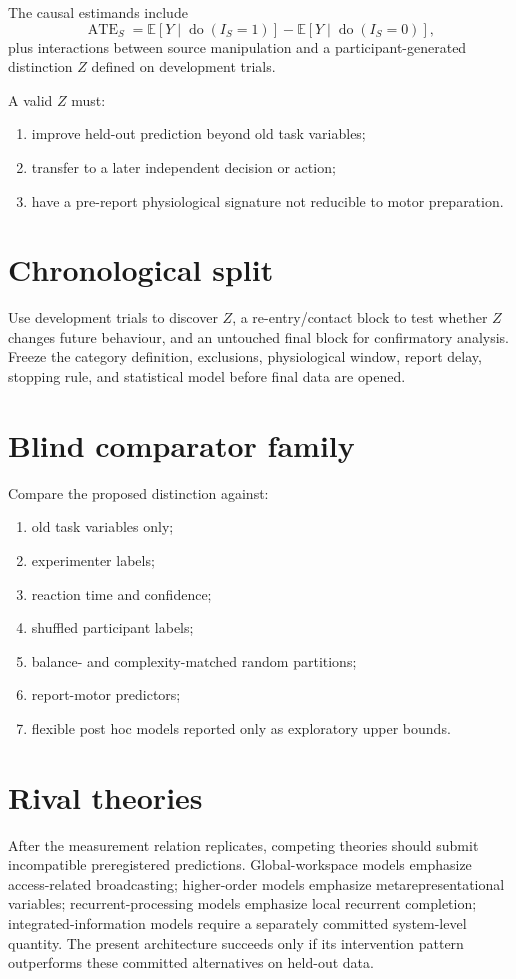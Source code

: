 \documentclass[11pt,a4paper]{article}
\begin{document}
The causal estimands include
\begin{equation}
\operatorname{ATE}_S=\mathbb E[Y\mid\operatorname{do}(I_S=1)]-\mathbb E[Y\mid\operatorname{do}(I_S=0)],
\end{equation}
plus interactions between source manipulation and a participant-generated distinction $Z$ defined on development trials.

A valid $Z$ must:
\begin{enumerate}
\item improve held-out prediction beyond old task variables;
\item transfer to a later independent decision or action;
\item have a pre-report physiological signature not reducible to motor preparation.
\end{enumerate}

\section{Chronological split}
Use development trials to discover $Z$, a re-entry/contact block to test whether $Z$ changes future behaviour, and an untouched final block for confirmatory analysis. Freeze the category definition, exclusions, physiological window, report delay, stopping rule, and statistical model before final data are opened.

\section{Blind comparator family}
Compare the proposed distinction against:
\begin{enumerate}
\item old task variables only;
\item experimenter labels;
\item reaction time and confidence;
\item shuffled participant labels;
\item balance- and complexity-matched random partitions;
\item report-motor predictors;
\item flexible post hoc models reported only as exploratory upper bounds.
\end{enumerate}

\section{Rival theories}
After the measurement relation replicates, competing theories should submit incompatible preregistered predictions. Global-workspace models emphasize access-related broadcasting; higher-order models emphasize metarepresentational variables; recurrent-processing models emphasize local recurrent completion; integrated-information models require a separately committed system-level quantity. The present architecture succeeds only if its intervention pattern outperforms these committed alternatives on held-out data.
\end{document}
